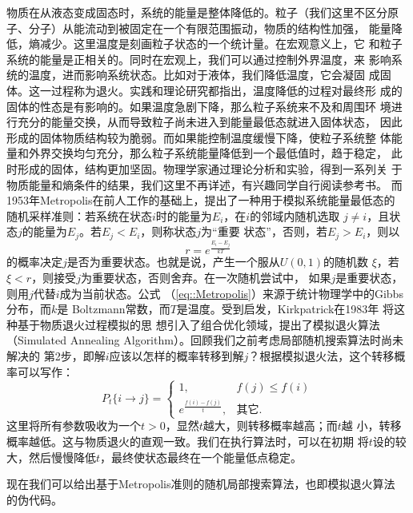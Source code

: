 物质在从液态变成固态时，系统的能量是整体降低的。粒子（我们这里不区分原
  子、分子）从能流动到被固定在一个有限范围振动，物质的结构性加强，
能量降低，熵减少。这里温度是刻画粒子状态的一个统计量。在宏观意义上，它
和粒子系统的能量是正相关的。同时在宏观上，我们可以通过控制外界温度，来
影响系统的温度，进而影响系统状态。比如对于液体，我们降低温度，它会凝固
成固体。这一过程称为退火。实践和理论研究都指出，温度降低的过程对最终形
成的固体的性态是有影响的。如果温度急剧下降，那么粒子系统来不及和周围环
境进行充分的能量交换，从而导致粒子尚未进入到能量最低态就进入固体状态，
因此形成的固体物质结构较为脆弱。而如果能控制温度缓慢下降，使粒子系统整
体能量和外界交换均匀充分，那么粒子系统能量降低到一个最低值时，趋于稳定，
此时形成的固体，结构更加坚固。物理学家通过理论分析和实验，得到一系列关
于物质能量和熵条件的结果，我们这里不再详述，有兴趣同学自行阅读参考书。
而1953年Metropolis在前人工作的基础上，提出了一种用于模拟系统能量最低态的
随机采样准则：若系统在状态$i$时的能量为$E_i$，在$i$的邻域内随机选取
$j\neq i$，且状态$j$的能量为$E_j$。若$E_j < E_i$，则称状态$j$为“重要
状态”，否则，若$E_j > E_i$，则以
\begin{equation}
  r = e^{\frac{E_i - E_j}{kT}}
  \label{eq::Metropolis}
\end{equation}
的概率决定$j$是否为重要状态。也就是说，产生一个服从$U(0, 1)$的随机数
$\xi$，若$\xi < r$，则接受$j$为重要状态，否则舍弃。在一次随机尝试中，
如果$j$是重要状态，则用$j$代替$i$成为当前状态。公式
（\ref{eq::Metropolis}）来源于统计物理学中的Gibbs分布，而$k$是
Boltzmann常数，而$T$是温度。受到启发，Kirkpatrick在1983年
\cite{KirkpatrickGelattVecchi83}将这种基于物质退火过程模拟的思
想引入了组合优化领域，提出了模拟退火算法（Simulated Annealing Algorithm）。回顾我们之前考虑局部随机搜索算法时尚未解决的
第2步，即解$i$应该以怎样的概率转移到解$j$？根据模拟退火法，这个转移概
率可以写作：
\begin{equation}
  P_t\{i \to j\} = \left\{
  \begin{array}{ll}
    1, & f(j) \leq f(i)\\
    e^{\frac{f(i) - f(j)}{t}}, &\mbox{其它}.
  \end{array}
  \right.
  \label{eq::SAA_metro}
\end{equation}
这里将所有参数吸收为一个$t > 0$，显然$t$越大，则转移概率越高；而$t$越
小，转移概率越低。这与物质退火的直观一致。我们在执行算法时，可以在初期
将$t$设的较大，然后慢慢降低$t$，最终使状态最终在一个能量低点稳定。

现在我们可以给出基于Metropolis准则的随机局部搜索算法，也即模拟退火算法
的伪代码。

